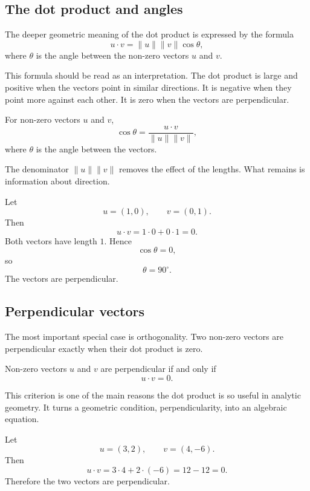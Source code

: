 \subsection*{The dot product and angles}

The deeper geometric meaning of the dot product is expressed by the formula
\[
u\cdot v=\lVert u\rVert\lVert v\rVert\cos\theta,
\]
where \(\theta\) is the angle between the non-zero vectors \(u\) and \(v\).

This formula should be read as an interpretation. The dot product is large and positive when the vectors point in similar directions. It is negative when they point more against each other. It is zero when the vectors are perpendicular.

\begin{theorembox}
For non-zero vectors \(u\) and \(v\),
\[
\cos\theta=\frac{u\cdot v}{\lVert u\rVert\lVert v\rVert},
\]
where \(\theta\) is the angle between the vectors.
\end{theorembox}

The denominator \(\lVert u\rVert\lVert v\rVert\) removes the effect of the lengths. What remains is information about direction.

\begin{examplebox}
Let
\[
u=(1,0),
\qquad
v=(0,1).
\]
Then
\[
u\cdot v=1\cdot0+0\cdot1=0.
\]
Both vectors have length \(1\). Hence
\[
\cos\theta=0,
\]
so
\[
\theta=90^\circ.
\]
The vectors are perpendicular.
\end{examplebox}

\subsection*{Perpendicular vectors}

The most important special case is orthogonality. Two non-zero vectors are perpendicular exactly when their dot product is zero.

\begin{theorembox}
Non-zero vectors \(u\) and \(v\) are perpendicular if and only if
\[
u\cdot v=0.
\]
\end{theorembox}

This criterion is one of the main reasons the dot product is so useful in analytic geometry. It turns a geometric condition, perpendicularity, into an algebraic equation.

\begin{examplebox}
Let
\[
u=(3,2),
\qquad
v=(4,-6).
\]
Then
\[
u\cdot v=3\cdot4+2\cdot(-6)=12-12=0.
\]
Therefore the two vectors are perpendicular.
\end{examplebox}

